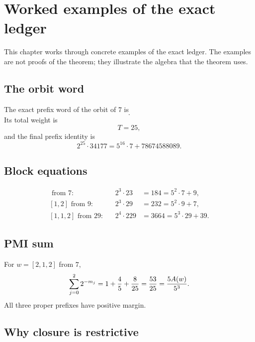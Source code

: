 \section{Worked examples of the exact ledger}

This chapter works through concrete examples of the exact ledger.  The
examples are not proofs of the theorem; they illustrate the algebra
that the theorem uses.

\subsection{The orbit word}

The exact prefix word of the orbit of $7$ is
\begin{equation*}
  [2,1,2,1,1,2,1,1,1,2,2,2,2,1,1,3].
\end{equation*}
Its total weight is
\begin{equation*}
  T=25,
\end{equation*}
and the final prefix identity is
\begin{equation*}
  2^{25}\cdot34177=5^{16}\cdot7+78674588089.
\end{equation*}

\subsection{Block equations}

\begin{align*}
  [2,1]\text{ from }7:&&
  2^3\cdot23&=184=5^2\cdot7+9,\\
  [1,2]\text{ from }9:&&
  2^3\cdot29&=232=5^2\cdot9+7,\\
  [1,1,2]\text{ from }29:&&
  2^4\cdot229&=3664=5^3\cdot29+39.
\end{align*}

\subsection{PMI sum}

For $w=[2,1,2]$ from $7$,
\begin{equation*}
  \sum_{j=0}^{2}2^{-m_j}
    =1+\frac45+\frac8{25}
    =\frac{53}{25}
    =\frac{5A(w)}{5^3}.
\end{equation*}
All three proper prefixes have positive margin.

\subsection{Why closure is restrictive}

